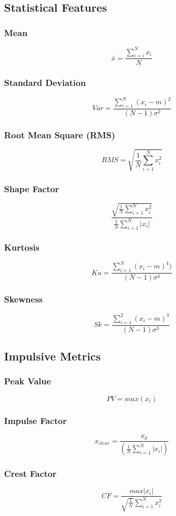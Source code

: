 \documentclass{article}
\begin{document}
\subsection{Statistical Features}
\subsubsection{Mean}
$$ \bar{x} = \frac{\sum^N_{i=i} x_i}{N} $$
\subsubsection{Standard Deviation}  
$$ Var =\frac{\sum^N_{i=1}(x_i-m)^2}{(N-1)\sigma^2} $$
\subsubsection{Root Mean Square (RMS)}
$$ RMS = \sqrt{\frac{1}{N} \sum^N_{i=1}x^2_i} $$
\subsubsection{Shape Factor}
$$ \frac{ \sqrt{\frac{1}{N} \sum^N_{i=1}x_i^2} }  {\frac{1}{N}\sum^N_{i=1}|x_i|} $$
\subsubsection{Kurtosis} 
$$ Ku = \frac{\sum^N_{i=1}(x_i-m)^4)}{(N-1)\sigma^4} $$ 
\subsubsection{Skewness} 
$$ Sk = \frac{\sum^2_{i=1}(x_i-m)^3}{(N-1)\sigma^3} $$
  
\subsection{Impulsive Metrics}  
\subsubsection{Peak Value}
$$ PV = max(x_i) $$ 
\subsubsection{Impulse Factor} 
$$ x_{clear} = \frac{x_p}{(\frac{1}{N}\sum^N_{i=1}|x_i|)} $$  
\subsubsection{Crest Factor} 
$$ CF = \frac{max|x_i|}{\sqrt{\frac{1}{N}}\sum^N_{i=1}x^2_i} $$
\end{document}
